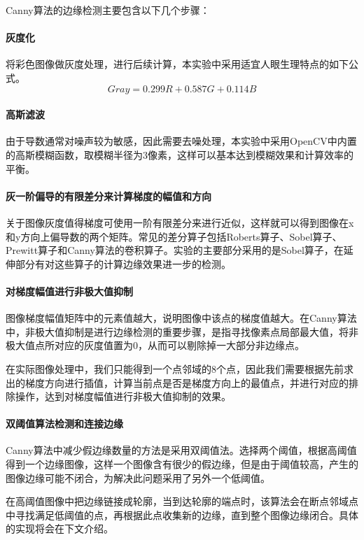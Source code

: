 \documentclass{article}
\begin{document}
Canny算法的边缘检测主要包含以下几个步骤：
\paragraph{灰度化} 将彩色图像做灰度处理，进行后续计算，本实验中采用适宜人眼生理特点的如下公式。
$$Gray=0.299R+0.587G+0.114B$$

\paragraph{高斯滤波}由于导数通常对噪声较为敏感，因此需要去噪处理，本实验中采用OpenCV中内置的高斯模糊函数，取模糊半径为3像素，这样可以基本达到模糊效果和计算效率的平衡。


\paragraph{灰一阶偏导的有限差分来计算梯度的幅值和方向} 关于图像灰度值得梯度可使用一阶有限差分来进行近似，这样就可以得到图像在x和y方向上偏导数的两个矩阵。常见的差分算子包括Roberts算子、Sobel算子、Prewitt算子和Canny算法的卷积算子。实验的主要部分采用的是Sobel算子，在延伸部分有对这些算子的计算边缘效果进一步的检测。

\paragraph{对梯度幅值进行非极大值抑制} 图像梯度幅值矩阵中的元素值越大，说明图像中该点的梯度值越大。在Canny算法中，非极大值抑制是进行边缘检测的重要步骤，是指寻找像素点局部最大值，将非极大值点所对应的灰度值置为0，从而可以剔除掉一大部分非边缘点。

在实际图像处理中，我们只能得到一个点邻域的8个点，因此我们需要根据先前求出的梯度方向进行插值，计算当前点是否是梯度方向上的最值点，并进行对应的排除操作，达到对梯度幅值进行非极大值抑制的效果。

\paragraph{双阈值算法检测和连接边缘} Canny算法中减少假边缘数量的方法是采用双阈值法。选择两个阈值，根据高阈值得到一个边缘图像，这样一个图像含有很少的假边缘，但是由于阈值较高，产生的图像边缘可能不闭合，为解决此问题采用了另外一个低阈值。

在高阈值图像中把边缘链接成轮廓，当到达轮廓的端点时，该算法会在断点邻域点中寻找满足低阈值的点，再根据此点收集新的边缘，直到整个图像边缘闭合。具体的实现将会在下文介绍。
\end{document}
